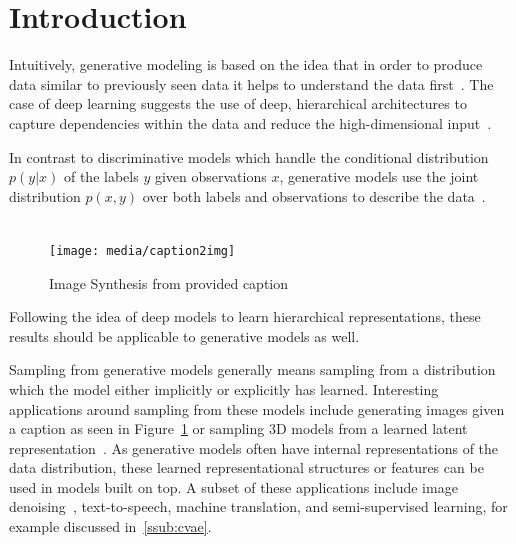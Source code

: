 \section{Introduction}
\label{sec:introduction}

Intuitively, generative modeling is based on the idea that in order to produce data similar to previously seen data it helps to understand the data first~\cite{salakhutdinov:2009}.
The case of deep learning suggests the use of deep, hierarchical architectures to capture dependencies within the data and reduce the high-dimensional input~\cite{reducing_dim:2006}.

In contrast to discriminative models which handle the conditional distribution $p(y|x)$ of the labels $y$ given observations $x$, generative models use the joint distribution $p(x,y)$ over both labels and observations to describe the data~\cite{learning_dbn:2006}.\\\\




\begin{figure}[h]
  \texttt{[image: media/caption2img]}
  \caption[Caption-to-Image Samples]{Image Synthesis from provided caption~\cite{gan_t2i:2016}}
\label{fig:caption2img}
\end{figure}

Following the idea of deep models to learn hierarchical representations, these results should be applicable to generative models as well.


Sampling from generative models generally means sampling from a distribution which the model either implicitly or explicitly has learned.
Interesting applications around sampling from these models include generating images given a caption as seen in Figure~\ref{fig:caption2img} or sampling 3D models from a learned latent representation~\cite{gan_3d:2016}.
As generative models often have internal representations of the data distribution, these learned representational structures or features can be used in models built on top.
A subset of these applications include
image denoising~\cite{generative_denoising:2013}, %
text-to-speech, %
machine translation, %
and semi-supervised learning, for example discussed in~\ref{ssub:cvae}.
\\\\

